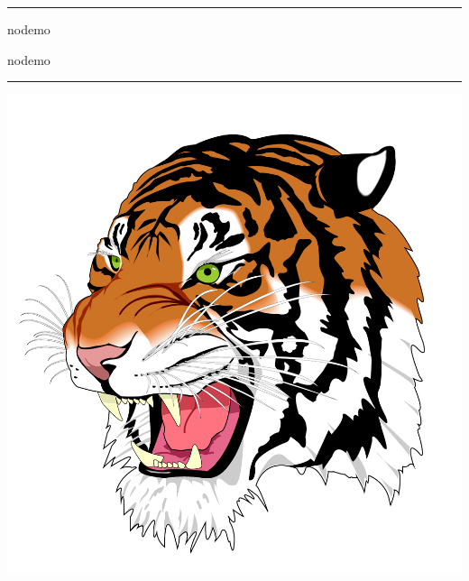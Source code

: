\documentclass[a4paper,\myClassOptions]{article}
\begin{document}
\hrule
\begin{description}
  \Large
  \item[graphicx:] nodemo
  \item[pdfpages:] nodemo
\end{description}
\hrule

\tableofcontents
\includegraphics[scale=.4]{dum/tiger.pdf}


\end{document}
